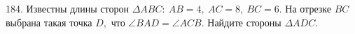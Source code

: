184. Известны длины сторон $\Delta ABC:\ AB = 4,\ AC = 8,\  BC = 6.$ На отрезке $BC$ выбрана такая точка $D,$ что $\angle BAD = \angle ACB.$ Найдите стороны $\Delta ADC.$\\
